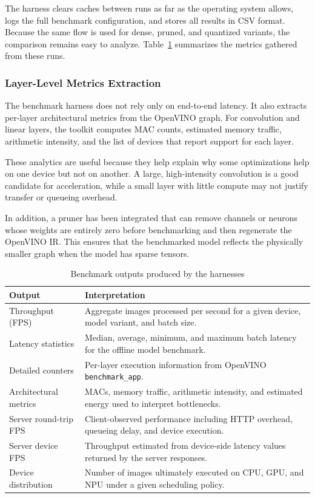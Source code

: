 \documentclass[conference]{IEEEtran}
\begin{document}
The harness clears caches between runs as far as the operating system allows, logs the full benchmark configuration, and stores all results in CSV format. Because the same flow is used for dense, pruned, and quantized variants, the comparison remains easy to analyze. Table~\ref{tab:benchmark-outputs} summarizes the metrics gathered from these runs.

\subsubsection{Layer-Level Metrics Extraction}
The benchmark harness does not rely only on end-to-end latency. It also extracts per-layer architectural metrics from the OpenVINO graph. For convolution and linear layers, the toolkit computes MAC counts, estimated memory traffic, arithmetic intensity, and the list of devices that report support for each layer.

These analytics are useful because they help explain why some optimizations help on one device but not on another. A large, high-intensity convolution is a good candidate for acceleration, while a small layer with little compute may not justify transfer or queueing overhead.

In addition, a pruner has been integrated that can remove channels or neurons whose weights are entirely zero before benchmarking and then regenerate the OpenVINO IR. This ensures that the benchmarked model reflects the physically smaller graph when the model has sparse tensors.

\begin{table}[t]
\caption{Benchmark outputs produced by the harnesses}
\label{tab:benchmark-outputs}
\centering
\begin{tabularx}{\columnwidth}{>{\raggedright\arraybackslash}p{}X}
\toprule
Output & Interpretation \\
\midrule
Throughput (FPS) & Aggregate images processed per second for a given device, model variant, and batch size. \\
Latency statistics & Median, average, minimum, and maximum batch latency for the offline model benchmark. \\
Detailed counters & Per-layer execution information from OpenVINO \texttt{benchmark\_app}. \\
Architectural metrics & MACs, memory traffic, arithmetic intensity, and estimated energy used to interpret bottlenecks. \\
Server round-trip FPS & Client-observed performance including HTTP overhead, queueing delay, and device execution. \\
Server device FPS & Throughput estimated from device-side latency values returned by the server responses. \\
Device distribution & Number of images ultimately executed on CPU, GPU, and NPU under a given scheduling policy. \\
\bottomrule
\end{tabularx}
\end{table}
\end{document}
